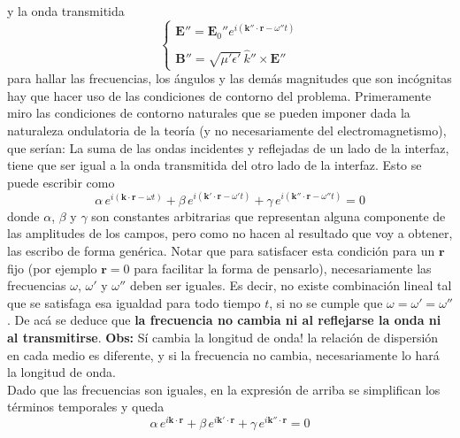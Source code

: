 y la onda transmitida
\begin{equation*}
    \left\{
        \begin{matrix}
            \textbf{E}'' = \textbf{E}_{0}''e^{i(\textbf{k}''\cdot \textbf{r} - \omega'' t)}\\
            \\
            \textbf{B}'' = \sqrt{\mu'\epsilon'}\,\hat{k}''\times \textbf{E}''
        \end{matrix}
    \right.
\end{equation*}
para hallar las frecuencias, los ángulos y las demás magnitudes que son incógnitas hay que hacer uso de las condiciones de contorno del problema. Primeramente miro las condiciones de contorno naturales que se pueden imponer dada la naturaleza ondulatoria de la teoría (y no necesariamente del electromagnetismo), que serían: La suma de las ondas incidentes y reflejadas de un lado de la interfaz, tiene que ser igual a la onda transmitida del otro lado de la interfaz. Esto se puede escribir como
\begin{equation*}
    \alpha\,e^{i(\textbf{k}\cdot \textbf{r} - \omega t)} +
    \beta\,e^{i(\textbf{k}'\cdot \textbf{r} - \omega' t)} +
    \gamma\,e^{i(\textbf{k}''\cdot \textbf{r} - \omega'' t)} = 0
\end{equation*}
donde $\alpha$, $\beta$ y $\gamma$ son constantes arbitrarias que representan alguna componente de las amplitudes de los campos, pero como no hacen al resultado que voy a obtener, las escribo de forma genérica. Notar que para satisfacer esta condición para un $\textbf{r}$ fijo (por ejemplo $\textbf{r} = 0$ para facilitar la forma de pensarlo), necesariamente las frecuencias $\omega$, $\omega'$ y $\omega''$ deben ser iguales. Es decir, no existe combinación lineal tal que se satisfaga esa igualdad para todo tiempo $t$, si no se cumple que $\omega = \omega' = \omega''$. De acá se deduce que \textbf{la frecuencia no cambia ni al reflejarse la onda ni al transmitirse}. \textbf{Obs:} Sí cambia la longitud de onda! la relación de dispersión en cada medio es diferente, y si la frecuencia no cambia, necesariamente lo hará la longitud de onda.\\
\indent Dado que las frecuencias son iguales, en la expresión de arriba se simplifican los términos temporales y queda 
\begin{equation*}
    \alpha\,e^{i\textbf{k}\cdot \textbf{r}} +
    \beta\,e^{i\textbf{k}'\cdot \textbf{r}} +
    \gamma\,e^{i\textbf{k}''\cdot \textbf{r}} = 0
\end{equation*}
